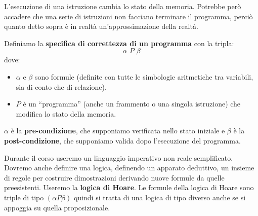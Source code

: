 L'esecuzione di una istruzione cambia lo stato della memoria. Potrebbe però
accadere che una serie di istruzioni non facciano terminare il programma, perciò
quanto detto sopra è in realtà un'approssimazione della realtà.
\begin{definizione}
	Definiamo la \textbf{specifica di correttezza di un programma} con la tripla:
	\[\alpha\,\, P\,\, \beta\]
	dove:
	\begin{itemize}
		\item $\alpha$ e $\beta$ sono formule (definite con tutte le simbologie
		      aritmetiche tra variabili, sia di conto che di relazione).
		\item $P$ è un ``programma'' (anche un frammento o una singola istruzione) che
		      modifica lo stato della memoria.
	\end{itemize}
	$\alpha$ è la \textbf{pre-condizione}, che supponiamo verificata nello stato
	iniziale e $\beta$ è la \textbf{post-condizione}, 
	che supponiamo valida dopo l'esecuzione del programma.
\end{definizione} \vspace{5mm} %
Durante il corso useremo un linguaggio imperativo non reale semplificato.
Dovremo anche definire una logica, definendo un apparato deduttivo, un insieme
di regole per costruire dimostrazioni derivando nuove formule da quelle
preesistenti. Useremo la \textbf{logica di Hoare}. Le formule della logica di
Hoare sono triple di tipo $(\alpha P \beta)$ quindi si tratta di una logica di tipo diverso
anche se si appoggia su quella proposizionale.
